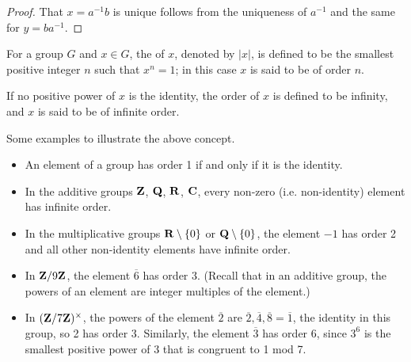 \begin{proof}
That $x=a^{-1}b$ is unique follows from the uniqueness of $a^{-1}$ and the same for $y=ba^{-1}$.
\end{proof}

\begin{definition}[Order]
For a group $G$ and $x\in G$, the  of $x$, denoted by $|x|$, is defined to be the smallest positive integer $n$ such that $x^n=1$; in this case $x$ is said to be of order $n$.

If no positive power of $x$ is the identity, the order of $x$ is defined to be infinity, and $x$ is said to be of infinite order.
\end{definition}

\begin{example}
Some examples to illustrate the above concept.
\begin{itemize}
\item An element of a group has order 1 if and only if it is the identity.
\item In the additive groups $\mathbf Z$, $\mathbf Q$, $\mathbf R$, $\mathbf C$, every non-zero (i.e. non-identity) element has infinite order.
\item In the multiplicative groups $\mathbf R\setminus\{0\}$ or $\mathbf Q\setminus\{0\}$, the element $-1$ has order 2 and all other non-identity elements have infinite order.
\item In $\mathbf Z/9\mathbf Z$, the element $\overline{6}$ has order 3. (Recall that in an additive group, the powers of an element are integer multiples of the element.)
\item In $(\mathbf Z/7\mathbf Z)^\times$, the powers of the element $\overline{2}$ are $\overline{2},\overline{4},\overline{8}=\overline{1}$, the identity in this group, so 2 has order 3. Similarly, the element $\overline{3}$ has order 6, since $3^6$ is the smallest positive power of 3 that is congruent to 1 mod 7.
\end{itemize}
\end{example}

